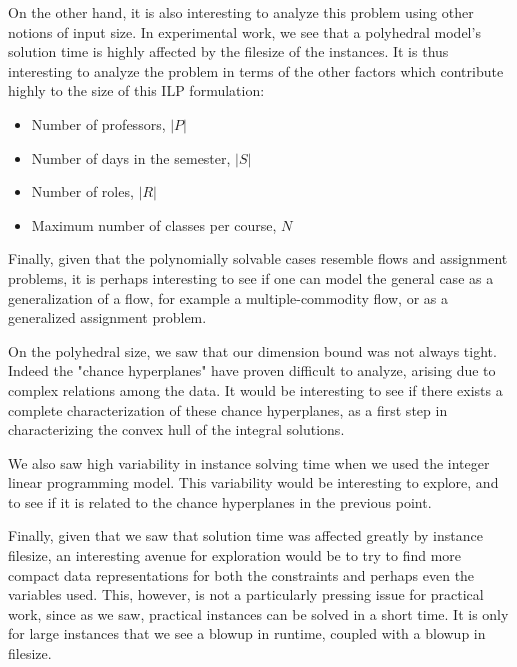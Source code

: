On the other hand, it is also interesting to analyze this problem using other notions of input size. In experimental work, we see that a polyhedral model's solution time is highly affected by the filesize of the instances. It is thus interesting to analyze the problem in terms of the other factors which contribute highly to the size of this ILP formulation:

\begin{itemize}
\item Number of professors, $|P|$
\item Number of days in the semester, $|S|$
\item Number of roles, $|R|$
\item Maximum number of classes per course, $N$
\end{itemize}

Finally, given that the polynomially solvable cases resemble flows and assignment problems, it is perhaps interesting to see if one can model the general case as a generalization of a flow, for example a multiple-commodity flow, or as a generalized assignment problem.

On the polyhedral size, we saw that our dimension bound was not always tight. Indeed the "chance hyperplanes" have proven difficult to analyze, arising due to complex relations among the data. It would be interesting to see if there exists a complete characterization of these chance hyperplanes, as a first step in characterizing the convex hull of the integral solutions.

We also saw high variability in instance solving time when we used the integer linear programming model. This variability would be interesting to explore, and to see if it is related to the chance hyperplanes in the previous point.

Finally, given that we saw that solution time was affected greatly by instance filesize, an interesting avenue for exploration would be to try to find more compact data representations for both the constraints and perhaps even the variables used. This, however, is not a particularly pressing issue for practical work, since as we saw, practical instances can be solved in a short time. It is only for large instances that we see a blowup in runtime, coupled with a blowup in filesize.
